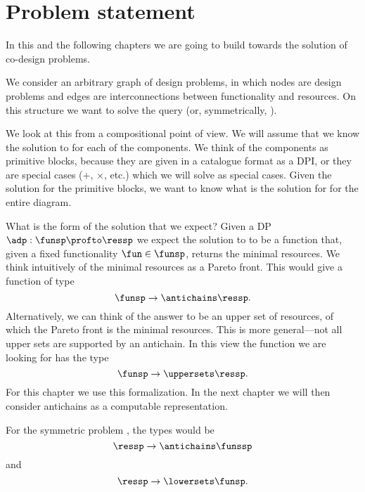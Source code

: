 

\section{Problem statement}
\label{sec:Optimization}


In this and the following chapters we are going to build towards the solution of co-design problems.

We consider an arbitrary graph of design problems, in which nodes are design problems and edges are interconnections
between functionality and resources. On this structure we want to solve the query \FixFunMinRes (or, symmetrically, \FixResMaxFun).




We look at this from a compositional point of view. We will assume that we know the solution to \FixFunMinRes for each of the components. We think of the components as primitive blocks, because they are given in a catalogue format as a DPI, or they are special cases ($+$, $\times$, etc.) which we will solve as special cases.
Given the solution for the primitive blocks, we want to know what is the solution for \FixFunMinRes for the entire diagram.

What is the form of the solution that we expect? Given a DP $\adp: \funsp \profto \ressp$ we expect the solution
to \FixFunMinRes to be a function that, given a fixed functionality $\fun\in\funsp$, returns the minimal resources. We think intuitively of the minimal resources as a Pareto front. This would give a function of type
\begin{equation}
    \funsp \to \antichains\ressp.
\end{equation}
Alternatively, we can think of the answer to be an upper set of resources, of which the Pareto front is the minimal resources. This is more general---not all upper sets are supported by an antichain. In this view the function we are looking for has the type
\begin{equation}
    \funsp \to \uppersets\ressp.
\end{equation}
For this chapter we use this formalization. In the next chapter we will then consider antichains as a computable representation.

For the symmetric problem \FixResMaxFun, the types would be
\begin{equation}
    \ressp \to \antichains\funssp
\end{equation}
and
\begin{equation}
    \ressp \to \lowersets\funsp.
\end{equation}


